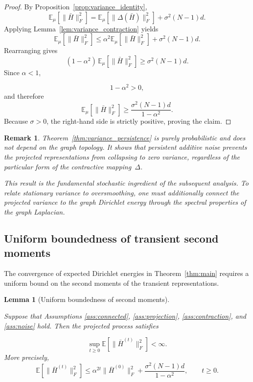 \documentclass{article}
\newtheorem{lemma}[theorem]{Lemma}
\newtheorem{remark}{Remark}[section]
\begin{document}
\begin{proof}
	
	By Proposition~\ref{prop:variance_identity},
	\[
	\mathbb E_\mu
	\!\left[
	\|\bar H\|_F^2
	\right]
	=
	\mathbb E_\mu
	\!\left[
	\|\Delta(\bar H)\|_F^2
	\right]
	+
	\sigma^2(N-1)d.
	\]
	Applying Lemma~\ref{lem:variance_contraction} yields
	\[
	\mathbb E_\mu
	\!\left[
	\|\bar H\|_F^2
	\right]
	\le
	\alpha^2
	\mathbb E_\mu
	\!\left[
	\|\bar H\|_F^2
	\right]
	+
	\sigma^2(N-1)d.
	\]
	Rearranging gives	
	\[
	(1-\alpha^2)
	\,
	\mathbb E_\mu
	\!\left[
	\|\bar H\|_F^2
	\right]
	\ge
	\sigma^2(N-1)d.
	\]
	Since
	$\alpha<1$,
	
	\[
	1-\alpha^2>0,
	\]
	and therefore	
	\[
	\mathbb E_\mu
	\!\left[
	\|\bar H\|_F^2
	\right]
	\ge
	\frac{\sigma^2(N-1)d}
	{1-\alpha^2}.
	\]	
	Because
	$\sigma>0$,
	the right-hand side is strictly positive, proving the claim.
	
\end{proof}

\begin{remark}
	
	Theorem~\ref{thm:variance_persistence}
	is purely probabilistic and does not depend on the graph topology.
	It shows that persistent additive noise prevents the projected
	representations from collapsing to zero variance, regardless of the
	particular form of the contractive mapping~$\Delta$.
	
	This result is the fundamental stochastic ingredient of the subsequent
	analysis.
	To relate stationary variance to oversmoothing, one must additionally
	connect the projected variance to the graph Dirichlet energy through the
	spectral properties of the graph Laplacian.
	
\end{remark}


\subsection{Uniform boundedness of transient second moments}

The convergence of expected Dirichlet energies in
Theorem~\ref{thm:main}
requires a uniform bound on the second moments of the transient
representations.

\begin{lemma}[Uniform boundedness of second moments]
	\label{lem:uniform_second_moment}
	
Suppose that Assumptions
\ref{ass:connected},
\ref{ass:projection},
\ref{ass:contraction},
and
\ref{ass:noise}
hold.	
	Then the projected process satisfies
	
	\[
	\sup_{t\ge0}
	\mathbb E
	\!\left[
	\|\bar H^{(t)}\|_F^2
	\right]
	<
	\infty.
	\]
	More precisely,	
	\[
	\mathbb E
	\!\left[
	\|\bar H^{(t)}\|_F^2
	\right]
	\le
	\alpha^{2t}
	\|\bar H^{(0)}\|_F^2
	+
	\frac{\sigma^2 (N-1)d}
	{1-\alpha^2},
	\qquad
	t\ge0.
	\]
	
\end{lemma}
\end{document}
